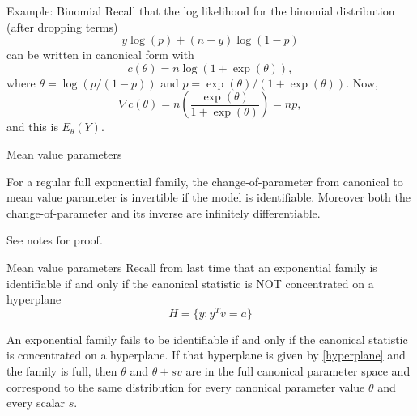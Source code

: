 \documentclass[
  ignorenonframetext,
]{beamer}
\begin{document}
\begin{frame}{Example: Binomial}
\protect\hypertarget{example-binomial}{}
Recall that the log likelihood for the binomial distribution (after
dropping terms) \[
  y\log(p) + (n-y)\log(1-p)
\] can be written in canonical form with \[
  c(\theta) = n\log(1 + \exp(\theta)),
\] where \(\theta = \log(p/(1-p))\) and
\(p = \exp(\theta)/(1 + \exp(\theta))\). Now, \[
  \nabla c(\theta) = n \left(\frac{\exp(\theta)}{1 + \exp(\theta)}\right) = np,
\] and this is \(E_\theta(Y)\).
\end{frame}

\begin{frame}{Mean value parameters}
\protect\hypertarget{mean-value-parameters-1}{}
\begin{thm} \label{thm-mvp}
For a regular full exponential family, the change-of-parameter from canonical to mean value parameter is invertible if the model is identifiable. Moreover both the change-of-parameter and its inverse are infinitely differentiable.
\end{thm}

\vspace*{12pt}

See notes for proof.
\end{frame}

\begin{frame}{Mean value parameters}
\protect\hypertarget{mean-value-parameters-2}{}
Recall from last time that an exponential family is identifiable if and
only if the canonical statistic is NOT concentrated on a hyperplane
\begin{equation}\label{hyperplane}
  H = \{y : y^Tv = a\}  
\end{equation}

\vspace*{12pt}

\begin{thm}
An exponential family fails to be identifiable if and only if the canonical statistic is concentrated on a hyperplane. If that hyperplane is given by \eqref{hyperplane} and the family is full, then $\theta$ and $\theta+sv$ are in the full canonical parameter space and correspond to the same distribution for every canonical parameter value $\theta$ and every scalar $s$.     
\end{thm}
\end{frame}
\end{document}
